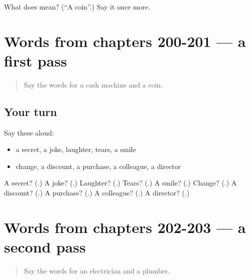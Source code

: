 \begin{tcolorbox}[breakable,colback=teal!4,colframe=teal!35!black,title={Before you move on}]
What does  mean? (\textquotedblleft{}A coin\textquotedblright{}.) Say it once more.
\end{tcolorbox}
\section[(dialogue)]{Words from chapters 200-201 — a first pass}

\label{lesson:RU-R203-first-pass-words-from-chapters-200-201}



\begin{quote}
Say the words for a cash machine and a coin.
\end{quote}

\subsection*{Your turn}
Say these aloud:

\begin{itemize}
\raggedright
  \item a secret, a joke, laughter, tears, a smile
  \item change, a discount, a purchase, a colleague, a director
\end{itemize}

\begin{tcolorbox}[breakable,colback=teal!4,colframe=teal!35!black,title={Before you move on}]
A secret? (\textbf{}.) A joke? (\textbf{}.) Laughter? (\textbf{}.) Tears? (\textbf{}.) A smile? (\textbf{}.) Change? (\textbf{}.) A discount? (\textbf{}.) A purchase? (\textbf{}.) A colleague? (\textbf{}.) A director? (\textbf{}.)
\end{tcolorbox}
\section[(dialogue)]{Words from chapters 202-203 — a second pass}

\label{lesson:RU-R203-second-pass-words-from-chapters-202-203}



\begin{quote}
Say the words for an electrician and a plumber.
\end{quote}

